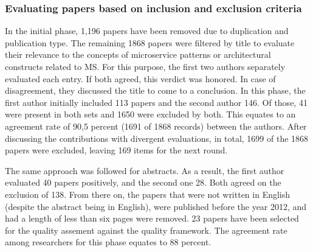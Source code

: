 \documentclass{bmcart}
\begin{document}

\subsubsection{Evaluating papers based on inclusion and exclusion criteria}

In the initial phase, 1,196 papers have been removed due to duplication and publication type. The remaining 1868 papers were filtered by title to evaluate their relevance to the concepts of microservice patterns or architectural constructs related to MS. For this purpose, the first two authors separately evaluated each entry. If both agreed, this verdict was honored. In case of disagreement, they discussed the title to come to a conclusion. In this phase, the first author initially included 113 papers and the second author 146. Of those, 41 were present in both sets and 1650 were excluded by both. This equates to an agreement rate of 90,5 percent (1691 of 1868 records) between the authors. After discussing the contributions with divergent evaluations, in total, 1699 of the 1868 papers were excluded, leaving 169 items for the next round. 

The same approach was followed for abstracts. As a result, the first author evaluated 40 papers positively, and the second one 28. Both agreed on the exclusion of 138. From there on, the papers that were not written in English (despite the abstract being in English), were published before the year 2012, and had a length of less than six pages were removed. 23 papers have been selected for the quality assement against the quality framework. The agreement rate among researchers for this phase equates to 88 percent. 




\end{document}
